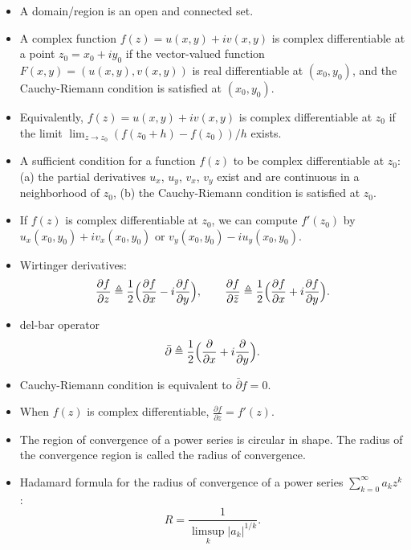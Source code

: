 \begin{itemize}
\item A domain/region is an open and connected set.

\item A complex function $f(z) = u(x,y)+i v(x,y)$ is complex differentiable at a point $z_0=x_0+iy_0$ if the vector-valued function $F(x,y) = (u(x,y),v(x,y))$ is real differentiable at $(x_0,y_0)$, and the Cauchy-Riemann condition is satisfied at $(x_0,y_0)$.

\item Equivalently, $f(z) = u(x,y)+i v(x,y)$ is complex differentiable at $z_0$ if the limit $\lim_{z\rightarrow z_0} (f(z_0+h)-f(z_0))/h$ exists. 

\item A sufficient condition for a function $f(z)$ to be complex differentiable at $z_0$: (a) the partial derivatives $u_x$, $u_y$, $v_x$, $v_y$ exist and are continuous in a neighborhood of $z_0$, (b) the Cauchy-Riemann condition is satisfied at $z_0$.

\item If $f(z)$ is complex differentiable at $z_0$, we can compute $f'(z_0)$ by $u_x(x_0,y_0)+i v_x(x_0,y_0)$ or $v_y(x_0,y_0) - i u_y(x_0,y_0)$.

\item Wirtinger derivatives:
$$
	\frac{\partial f}{\partial z} \triangleq \frac{1}{2} \Big( \frac{\partial f}{\partial x} - i \frac{\partial f}{\partial y}\Big) , \qquad 
	\frac{\partial f}{\partial \bar{z}} \triangleq \frac{1}{2} \Big( \frac{\partial f}{\partial x} + i \frac{\partial f}{\partial y}\Big).
$$

\item del-bar operator
$$
\bar{\partial} \triangleq  \frac{1}{2} \Big( \frac{\partial }{\partial x} + i \frac{\partial }{\partial y}\Big).
$$ 

\item Cauchy-Riemann condition is equivalent to $\bar{\partial} f = 0$.

\item When $f(z)$ is complex differentiable, $\frac{\partial f}{\partial z} = f'(z) $.


	\item The region of convergence of a power series is circular in shape. The radius of the convergence region is called the radius of convergence.

\item Hadamard formula for the radius of convergence of a power series $\sum_{k=0}^\infty a_k z^k$:
$$
R = \frac{1}{\limsup_k |a_k|^{1/k}}.
$$


\end{itemize}
